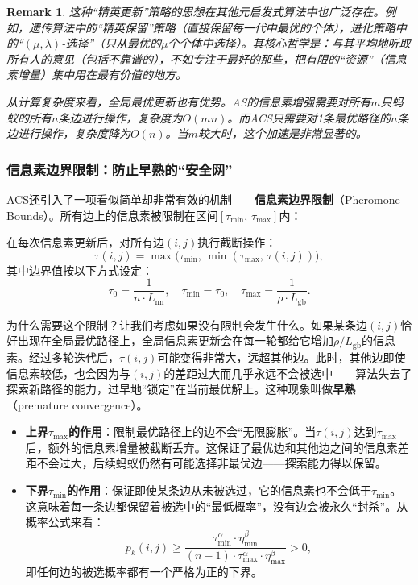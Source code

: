 \documentclass[lang=cn,zihao=-4,a4paper,fontset=windows]{beautybook}
\newtheorem*{remark}{\textbf{Remark}}
\begin{document}
\begin{remark}
这种“精英更新”策略的思想在其他元启发式算法中也广泛存在。例如，遗传算法中的“精英保留”策略（直接保留每一代中最优的个体），进化策略中的“$(\mu, \lambda)$-选择”（只从最优的$\mu$个个体中选择）。其核心哲学是：与其平均地听取所有人的意见（包括不靠谱的），不如专注于最好的那些，把有限的“资源”（信息素增量）集中用在最有价值的地方。

从计算复杂度来看，全局最优更新也有优势。AS的信息素增强需要对所有$m$只蚂蚁的所有$n$条边进行操作，复杂度为$O(mn)$。而ACS只需要对1条最优路径的$n$条边进行操作，复杂度降为$O(n)$。当$m$较大时，这个加速是非常显著的。
\end{remark}

\subsubsection{信息素边界限制：防止早熟的“安全网”}

ACS还引入了一项看似简单却非常有效的机制——\textbf{信息素边界限制}（Pheromone Bounds）。所有边上的信息素被限制在区间$[\tau_{\min},\, \tau_{\max}]$内：

\begin{definition}[][信息素边界限制]
在每次信息素更新后，对所有边$(i,j)$执行截断操作：
\[
\tau(i,j) = \max\big(\tau_{\min},\, \min(\tau_{\max},\, \tau(i,j))\big),
\]
其中边界值按以下方式设定：
\[
\tau_0 = \frac{1}{n \cdot L_{\text{nn}}}, \quad \tau_{\min} = \tau_0, \quad \tau_{\max} = \frac{1}{\rho \cdot L_{\text{gb}}}.
\]
\end{definition}

为什么需要这个限制？让我们考虑如果没有限制会发生什么。如果某条边$(i,j)$恰好出现在全局最优路径上，全局信息素更新会在每一轮都给它增加$\rho/L_{\text{gb}}$的信息素。经过多轮迭代后，$\tau(i,j)$可能变得非常大，远超其他边。此时，其他边即使信息素较低，也会因为与$(i,j)$的差距过大而几乎永远不会被选中——算法失去了探索新路径的能力，过早地“锁定”在当前最优解上。这种现象叫做\textbf{早熟}（premature convergence）。

\begin{itemize}
    \item \textbf{上界$\tau_{\max}$的作用}：限制最优路径上的边不会“无限膨胀”。当$\tau(i,j)$达到$\tau_{\max}$后，额外的信息素增量被截断丢弃。这保证了最优边和其他边之间的信息素差距不会过大，后续蚂蚁仍然有可能选择非最优边——探索能力得以保留。
    \item \textbf{下界$\tau_{\min}$的作用}：保证即使某条边从未被选过，它的信息素也不会低于$\tau_{\min}$。这意味着每一条边都保留着被选中的“最低概率”，没有边会被永久“封杀”。从概率公式来看：
    \[
    p_k(i,j) \geq \frac{\tau_{\min}^\alpha \cdot \eta_{\min}^\beta}{(n-1) \cdot \tau_{\max}^\alpha \cdot \eta_{\max}^\beta} > 0,
    \]
    即任何边的被选概率都有一个严格为正的下界。
\end{itemize}
\end{document}
